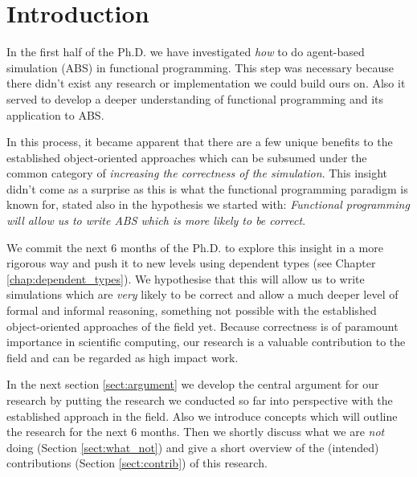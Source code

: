 \chapter{Introduction}
\label{chap:intro}
In the first half of the Ph.D. we have investigated \textit{how} to do agent-based simulation (ABS) in functional programming. This step was necessary because there didn't exist any research or implementation we could build ours on. Also it served to develop a deeper understanding of functional programming and its application to ABS.

In this process, it became apparent that there are a few unique benefits to the established object-oriented approaches which can be subsumed under the common category of \textit{increasing the correctness of the simulation}. This insight didn't come as a surprise as this is what the functional programming paradigm is known for, stated also in the hypothesis we started with: \textit{Functional programming will allow us to write ABS which is more likely to be correct}. %

We commit the next 6 months of the Ph.D. to explore this insight in a more rigorous way and push it to new levels using dependent types (see Chapter \ref{chap:dependent_types}). We hypothesise that this will allow us to write simulations which are \textit{very} likely to be correct and allow a much deeper level of formal and informal reasoning, something not possible with the established object-oriented approaches of the field yet. Because correctness is of paramount importance in scientific computing, our research is a valuable contribution to the field and can be regarded as high impact work.

\medskip

In the next section \ref{sect:argument} we develop the central argument for our research by putting the research we conducted so far into perspective with the established approach in the field. Also we introduce concepts which will outline the research for the next 6 months. Then we shortly discuss what we are \textit{not} doing (Section \ref{sect:what_not}) and give a short overview of the (intended) contributions (Section \ref{sect:contrib}) of this research. 

